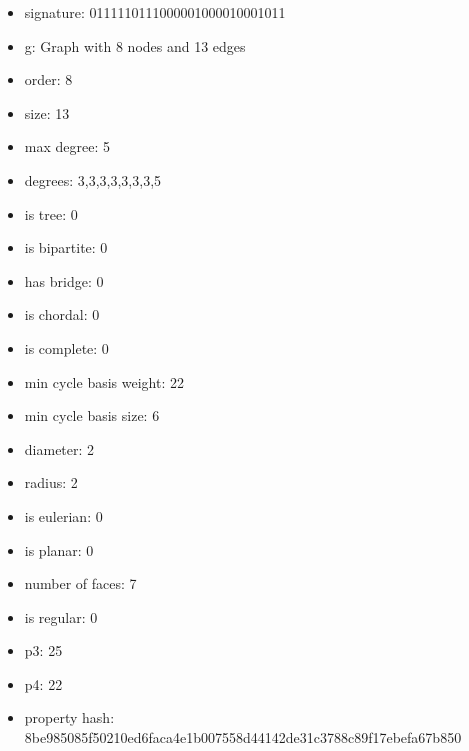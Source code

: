 \begin{itemize}
\item signature: 0111110111000001000010001011
\item g: Graph with 8 nodes and 13 edges
\item order: 8
\item size: 13
\item max degree: 5
\item degrees: 3,3,3,3,3,3,3,5
\item is tree: 0
\item is bipartite: 0
\item has bridge: 0
\item is chordal: 0
\item is complete: 0
\item min cycle basis weight: 22
\item min cycle basis size: 6
\item diameter: 2
\item radius: 2
\item is eulerian: 0
\item is planar: 0
\item number of faces: 7
\item is regular: 0
\item p3: 25
\item p4: 22
\item property hash: 8be985085f50210ed6faca4e1b007558d44142de31c3788c89f17ebefa67b850
\end{itemize}
\newpage
\begin{figure}
\end{figure}
